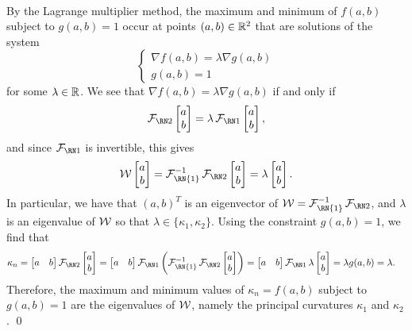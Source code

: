 \begin{pf}
\begin{align*}
    \end{align*}
    By the Lagrange multiplier method, the maximum and minimum of $f(a, b)$ 
    subject to $g(a, b) = 1$ occur at points $(a, b) \in \mathbb{R}^2$ that are 
    solutions of the system 
    \[ \begin{cases}
        \nabla f(a, b) = \lambda \nabla g(a, b) \\ 
        g(a, b) = 1
    \end{cases} \]
    for some $\lambda \in \mathbb{R}$. We see that $\nabla f(a, b) = \lambda \nabla 
    g(a, b)$ if and only if 
    \[ \SFF \begin{bmatrix} a \\ b \end{bmatrix} = \lambda \FFF 
    \begin{bmatrix} a \\ b \end{bmatrix}, \] 
    and since $\FFF$ is invertible, this gives 
    \[ {\cal W} \begin{bmatrix} a \\ b \end{bmatrix} = 
    {\cal F}_{\text{\RN{1}}}^{-1} \SFF \begin{bmatrix} a \\ b \end{bmatrix} 
    = \lambda \begin{bmatrix} a \\ b \end{bmatrix}. \] 
    In particular, we have that $(a, b)^T$ is an eigenvector of ${\cal W} 
    = {\cal F}_{\text{\RN{1}}}^{-1} \SFF$, and $\lambda$ is an 
    eigenvalue of ${\cal W}$ so that $\lambda \in \{\kappa_1, \kappa_2\}$. 
    Using the constraint $g(a, b) = 1$, we find that 
    \begin{align*}
        \kappa_n &= \begin{bmatrix} a & b \end{bmatrix} \SFF 
        \begin{bmatrix} a \\ b \end{bmatrix} 
        = \begin{bmatrix} a & b \end{bmatrix} \FFF 
        \left( {\cal F}_{\text{\RN{1}}}^{-1} \SFF 
        \begin{bmatrix} a \\ b \end{bmatrix} \right) 
        = \begin{bmatrix} a & b \end{bmatrix} \FFF \lambda  
        \begin{bmatrix} a \\ b \end{bmatrix} = \lambda g(a, b) = \lambda. 
    \end{align*}
    Therefore, the maximum and minimum values of $\kappa_n = f(a, b)$ 
    subject to $g(a, b) = 1$ are the eigenvalues of ${\cal W}$, namely 
    the principal curvatures $\kappa_1$ and $\kappa_2$. \qed 
\end{pf}\vspace{-0.25cm}\newpage

